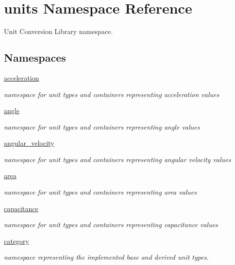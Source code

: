 \hypertarget{namespaceunits}{}\section{units Namespace Reference}
\label{namespaceunits}


Unit Conversion Library namespace.  


\subsection*{Namespaces}
\begin{DoxyCompactItemize}
\item 
 \hyperlink{namespaceunits_1_1acceleration}{acceleration}
\begin{DoxyCompactList}\small\item\em namespace for unit types and containers representing acceleration values \end{DoxyCompactList}\item 
 \hyperlink{namespaceunits_1_1angle}{angle}
\begin{DoxyCompactList}\small\item\em namespace for unit types and containers representing angle values \end{DoxyCompactList}\item 
 \hyperlink{namespaceunits_1_1angular__velocity}{angular\+\_\+velocity}
\begin{DoxyCompactList}\small\item\em namespace for unit types and containers representing angular velocity values \end{DoxyCompactList}\item 
 \hyperlink{namespaceunits_1_1area}{area}
\begin{DoxyCompactList}\small\item\em namespace for unit types and containers representing area values \end{DoxyCompactList}\item 
 \hyperlink{namespaceunits_1_1capacitance}{capacitance}
\begin{DoxyCompactList}\small\item\em namespace for unit types and containers representing capacitance values \end{DoxyCompactList}\item 
 \hyperlink{namespaceunits_1_1category}{category}
\begin{DoxyCompactList}\small\item\em namespace representing the implemented base and derived unit types. \end{DoxyCompactList}\item 

\end{DoxyCompactItemize}
